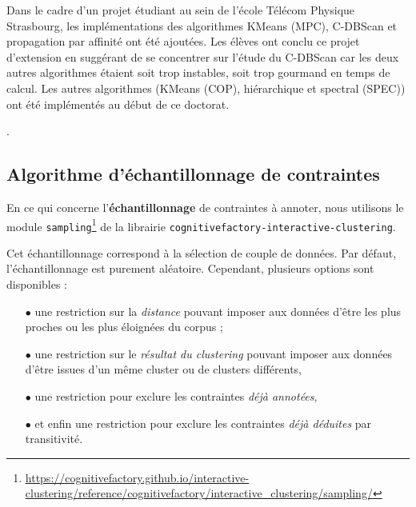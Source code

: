 		\begin{leftBarInformation}
			Dans le cadre d'un projet étudiant au sein de l'école Télécom Physique Strasbourg, les implémentations des algorithmes KMeans (MPC), C-DBScan et propagation par affinité ont été ajoutées. Les élèves ont conclu ce projet d'extension en suggérant de se concentrer sur l'étude du C-DBScan car les deux autres algorithmes étaient soit trop instables, soit trop gourmand en temps de calcul.
			Les autres algorithmes (KMeans (COP), hiérarchique et spectral (SPEC)) ont été implémentés au début de ce doctorat.
		\end{leftBarInformation}
		.
		
		
		\subsection{Algorithme d'échantillonnage de contraintes}
		\label{section:3.3.4-ALGORITHMES-ECHANTILLONNAGE-DE-CONTRAINTES}
		
		En ce qui concerne l'\textbf{échantillonnage} de contraintes à annoter, nous utilisons le module \texttt{sampling}\footnote{\url{https://cognitivefactory.github.io/interactive-clustering/reference/cognitivefactory/interactive_clustering/sampling/}} de la librairie \texttt{cognitivefactory-interactive-clustering}.
		
		Cet échantillonnage correspond à la sélection de couple de données.
		Par défaut, l'échantillonnage est purement aléatoire.
		Cependant, plusieurs options sont disponibles :
		
		\begin{itemize}
			\item[\(\bullet\)] une restriction sur la \textit{distance} pouvant imposer aux données d'être les plus proches ou les plus éloignées du corpus ;
			\item[\(\bullet\)] une restriction sur le \textit{résultat du clustering} pouvant imposer aux données d'être issues d'un même cluster ou de clusters différents,
			\item[\(\bullet\)] une restriction pour exclure les contraintes \textit{déjà annotées},
			\item[\(\bullet\)] et enfin une restriction pour exclure les contraintes \textit{déjà déduites} par transitivité.
		\end{itemize}
		
